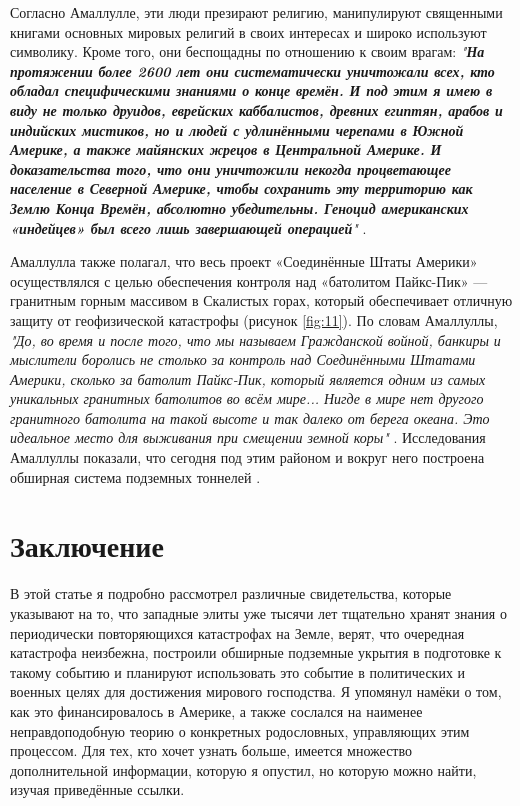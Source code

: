 \documentclass[10pt,twocolumn,letterpaper]{article}
\begin{document}
Согласно Амаллулле, эти люди презирают религию, манипулируют священными книгами основных мировых религий в своих интересах и широко используют символику. Кроме того, они беспощадны по отношению к своим врагам: \textit{"\textbf{На протяжении более 2600 лет они систематически уничтожали всех, кто обладал специфическими знаниями о конце времён. И под этим я имею в виду не только друидов, еврейских каббалистов, древних египтян, арабов и индийских мистиков, но и людей с удлинёнными черепами в Южной Америке, а также майянских жрецов в Центральной Америке. И доказательства того, что они уничтожили некогда процветающее население в Северной Америке, чтобы сохранить эту территорию как Землю Конца Времён, абсолютно убедительны. Геноцид американских «индейцев» был всего лишь завершающей операцией}"} \cite{33,34}.

Амаллулла также полагал, что весь проект «Соединённые Штаты Америки» осуществлялся с целью обеспечения контроля над «батолитом Пайкс-Пик» — гранитным горным массивом в Скалистых горах, который обеспечивает отличную защиту от геофизической катастрофы (рисунок \ref{fig:11}). По словам Амаллуллы, \textit{"До, во время и после того, что мы называем Гражданской войной, банкиры и мыслители боролись не столько за контроль над Соединёнными Штатами Америки, сколько за батолит Пайкс-Пик, который является одним из самых уникальных гранитных батолитов во всём мире... Нигде в мире нет другого гранитного батолита на такой высоте и так далеко от берега океана. Это идеальное место для выживания при смещении земной коры"} \cite{33,34}. Исследования Амаллуллы показали, что сегодня под этим районом и вокруг него построена обширная система подземных тоннелей \cite{36}.
\section{Заключение}

В этой статье я подробно рассмотрел различные свидетельства, которые указывают на то, что западные элиты уже тысячи лет тщательно хранят знания о периодически повторяющихся катастрофах на Земле, верят, что очередная катастрофа неизбежна, построили обширные подземные укрытия в подготовке к такому событию и планируют использовать это событие в политических и военных целях для достижения мирового господства. Я упомянул намёки о том, как это финансировалось в Америке, а также сослался на наименее неправдоподобную теорию о конкретных родословных, управляющих этим процессом. Для тех, кто хочет узнать больше, имеется множество дополнительной информации, которую я опустил, но которую можно найти, изучая приведённые ссылки.
\end{document}
